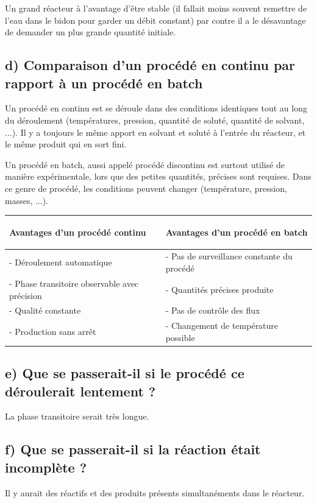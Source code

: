 \documentclass[a4paper,11pt, french]{article}
\begin{document}
Un grand réacteur à l'avantage d'être stable (il fallait moins souvent remettre de l'eau dans le bidon pour garder un débit constant) par contre il a le désavantage de demander un plus grande quantité initiale.

	\subsection*{d) Comparaison d'un procédé en continu par rapport à un procédé en batch}
Un procédé en continu est se déroule dans des conditions identiques tout au long du déroulement (températures, pression, quantité de soluté, quantité de solvant, ...). Il y a toujours le même apport en solvant et soluté à l'entrée du réacteur, et le même produit qui en sort fini.

Un procédé en batch, aussi appelé procédé discontinu est surtout utilisé de manière expérimentale, lors que des petites quantités, précises sont requises. Dans ce genre de procédé, les conditions peuvent changer (température, pression, masses, ...).

\begin{table}[h]\centering
\begin{tabular}{|m{}|m{}|}\hline
	\rowcolor{Gray}	
	\begin{center}Avantages d'un \textbf{procédé continu}\end{center} & \begin{center}Avantages d'un procédé en \textbf{batch}\end{center} \\\hline
	- Déroulement automatique & - Pas de surveillance constante du procédé \\
	- Phase transitoire observable avec précision & - Quantités précises produite \\
	- Qualité constante & - Pas de contrôle des flux \\
	- Production sans arrêt & - Changement de température possible \\\hline
\end{tabular}
\end{table}

	\subsection*{e) Que se passerait-il si le procédé ce déroulerait lentement ?}
La phase transitoire serait très longue.

	\subsection*{f) Que se passerait-il si la réaction était incomplète ?}
Il y aurait des réactifs et des produits présents simultanéments dans le réacteur. 
\end{document}

